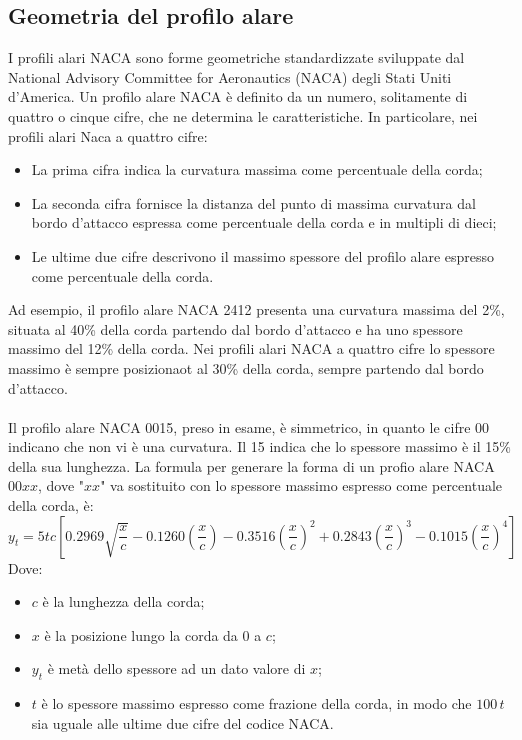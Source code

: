 \subsection{Geometria del profilo alare}
I profili alari NACA sono forme geometriche standardizzate sviluppate dal National Advisory Committee for Aeronautics (NACA) degli Stati Uniti d'America. Un profilo alare NACA è definito da un numero, solitamente di quattro o cinque cifre, che ne determina le caratteristiche. In particolare, nei profili alari Naca a quattro cifre:
\begin{itemize}
    \item La prima cifra indica la curvatura massima come percentuale della corda;
    \item La seconda cifra fornisce la distanza del punto di massima curvatura dal bordo d'attacco espressa come percentuale della corda e in multipli di dieci;
    \item Le ultime due cifre descrivono il massimo spessore del profilo alare espresso come percentuale della corda.
\end{itemize}
Ad esempio, il profilo alare NACA 2412 presenta una curvatura massima del 2\%, situata al 40\% della corda partendo dal bordo d'attacco e ha uno spessore massimo del 12\% della corda. Nei profili alari NACA a quattro cifre lo spessore massimo è sempre posizionaot al 30\% della corda, sempre partendo dal bordo d'attacco.\\\\
Il profilo alare NACA 0015, preso in esame, è simmetrico, in quanto le cifre 00 indicano che non vi è una curvatura. Il 15 indica che lo spessore massimo è il 15\% della sua lunghezza.
\newpage
\noindent La formula per generare la forma di un profio alare NACA $00xx$, dove "$xx$" va sostituito con lo spessore massimo espresso come percentuale della corda, è:
\begin{equation*}
    y_t = 5tc\left[ 0.2969\sqrt{\frac{x}{c}} -0.1260\left(\frac{x}{c}\right) -0.3516\left(\frac xc \right)^2 + 0.2843 \left( \frac xc \right)^3 -0.1015 \left( \frac xc \right)^4 \right]
\end{equation*}
Dove:
\begin{itemize}
    \item $c$ è la lunghezza della corda;
    \item $x$ è la posizione lungo la corda da 0 a $c$;
    \item $y_t$ è metà dello spessore ad un dato valore di $x$;
    \item $t$ è lo spessore massimo espresso come frazione della corda, in modo che $100\,t$ sia uguale alle ultime due cifre del codice NACA.
\end{itemize}

